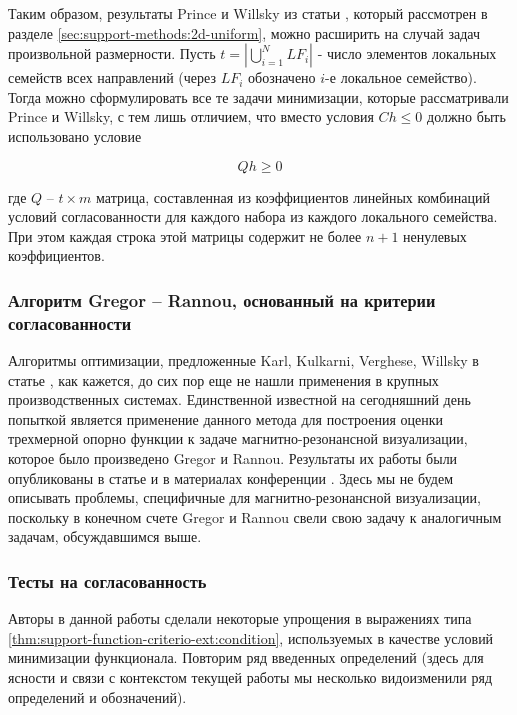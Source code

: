 \documentclass[a4paper, 12pt, titlepage]{article}
\theoremstyle{definition}
\theoremstyle{plain}
\theoremstyle{plain}
\begin{document}
Таким образом, результаты Prince и Willsky из
статьи \cite{journals/pami/PrinceW90}, который рассмотрен в разделе
\ref{sec:support-methods:2d-uniform}, можно расширить на случай задач
произвольной размерности. Пусть $t = |\bigcup \limits_{i = 1}^{N} LF_{i}|$ -
число элементов локальных семейств всех направлений (через $LF_{i}$ обозначено
$i$-е локальное семейство). Тогда можно сформулировать все те задачи
минимизации, которые рассматривали Prince и Willsky, с тем лишь отличием, что
вместо условия $Ch \leq 0$ должно быть использовано условие

\begin{equation}
 Q h \geq 0
\end{equation}

где $Q$ -- $t \times m$ матрица, составленная из коэффициентов линейных
комбинаций условий согласованности для каждого набора из каждого локального
семейства. При этом каждая строка этой матрицы содержит не более $n + 1$
ненулевых коэффициентов.

\subsubsection{Алгоритм Gregor -- Rannou, основанный на критерии
согласованности}
\label{sec:support-methods:3d-nonuniform:gregor-rannou}

Алгоритмы оптимизации, предложенные Karl, Kulkarni, Verghese, Willsky в статье
\cite{journals/jmiv/KarlKVW96}, как кажется, до сих пор еще не нашли применения
в крупных производственных системах. Единственной известной на
сегодняшний день попыткой является применение данного метода для построения
оценки трехмерной опорно функции к задаче магнитно-резонансной визуализации,
которое было произведено Gregor и Rannou. Результаты их работы были
опубликованы в статье \cite{journals/ijist/GregorR2002} и в материалах
конференции \cite{conf/spie/GregorR2001}. Здесь мы не будем описывать
проблемы, специфичные для магнитно-резонансной визуализации, поскольку в
конечном счете Gregor и Rannou свели свою задачу к аналогичным задачам,
обсуждавшимся выше.

\subsubsection{Тесты на согласованность}
\label{sec:support-methods:3d-nonuniform:consistency-tests}

Авторы в данной работы сделали некоторые упрощения в выражениях типа
\ref{thm:support-function-criterio-ext:condition}, используемых в качестве
условий минимизации функционала. Повторим ряд введенных определений (здесь для
ясности и связи с контекстом текущей работы мы несколько видоизменили ряд
определений и обозначений).
\end{document}
